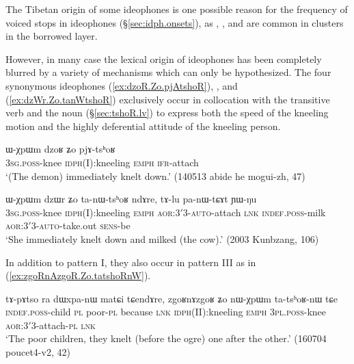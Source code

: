 The Tibetan origin of some ideophones is one possible reason for the frequency of voiced stops in ideophones (§\ref{sec:idph.onsets}), as , ,  and  are common in clusters in the borrowed layer.

However, in many case the lexical origin of ideophones has been completely blurred by a variety of mechanisms which can only be hypothesized. The four synonymous ideophones  (\ref{ex:dzoR.Zo.pjAtshoR}), ,  and  (\ref{ex:dzWr.Zo.tanWtshoR}) exclusively occur in collocation with the transitive verb  and the noun  (§\ref{sec:tshoR.lv}) to express both the speed of the kneeling motion and the highly deferential attitude of the kneeling person.  

\begin{exe}
\ex \label{ex:dzoR.Zo.pjAtshoR}
\gll ɯ-χpɯm dzoʁ ʑo pjɤ-tsʰoʁ \\
\textsc{3sg}.\textsc{poss}-knee \textsc{idph}(I):kneeling \textsc{emph} \textsc{ifr}-attach \\
\glt `(The demon) immediately knelt down.' (140513 abide he mogui-zh, 47)
\end{exe}

\begin{exe}
\ex \label{ex:dzWr.Zo.tanWtshoR}
\gll ɯ-χpɯm dzɯr ʑo ta-nɯ-tsʰoʁ ndɤre, tɤ-lu pa-nɯ-tɕɤt ɲɯ-ŋu \\
 \textsc{3sg}.\textsc{poss}-knee \textsc{idph}(I):kneeling \textsc{emph} \textsc{aor}:3$'$\fl{}3-\textsc{auto}-attach \textsc{lnk} \textsc{indef}.\textsc{poss}-milk \textsc{aor}:3$'$\fl{}3-\textsc{auto}-take.out \textsc{sens}-be \\
 \glt `She immediately knelt down and milked (the cow).' (2003 Kunbzang, 106)
\end{exe}

In addition to pattern I, they also occur in pattern III as in (\ref{ex:zgoRnAzgoR.Zo.tatshoRnW}).

\begin{exe}
\ex \label{ex:zgoRnAzgoR.Zo.tatshoRnW}
\gll  tɤ-pɤtso ra dɯxpa-nɯ matɕi tɕendɤre, zgoʁnɤzgoʁ ʑo nɯ-χpɯm ta-tsʰoʁ-nɯ tɕe \\
\textsc{indef}.\textsc{poss}-child \textsc{pl} poor-\textsc{pl} because \textsc{lnk} \textsc{idph}(II):kneeling \textsc{emph}  \textsc{3pl}.\textsc{poss}-knee \textsc{aor}:3$'$\fl{}3-attach-\textsc{pl} \textsc{lnk} \\
\glt `The poor children, they knelt (before the ogre) one after the other.' (160704 poucet4-v2, 42)
\end{exe}

